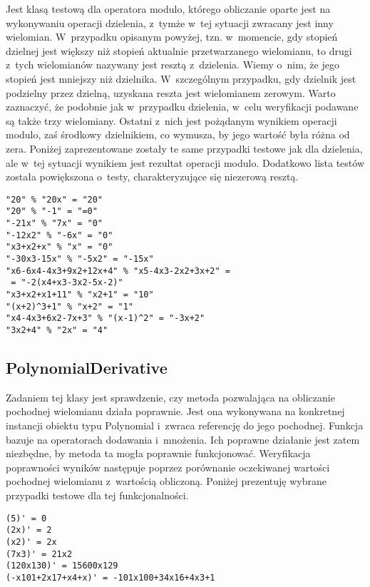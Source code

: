 Jest klasą testową dla operatora modulo, którego obliczanie oparte jest na wykonywaniu operacji dzielenia, z~tymże w~tej sytuacji zwracany jest inny wielomian. W~przypadku opisanym powyżej, tzn. w~momencie, gdy stopień dzielnej jest większy niż stopień aktualnie przetwarzanego wielomianu, to drugi z~tych wielomianów nazywany jest resztą z~dzielenia. Wiemy o~nim, że jego stopień jest mniejszy niż dzielnika. W~szczególnym przypadku, gdy dzielnik jest podzielny przez dzielną, uzyskana reszta jest wielomianem zerowym. Warto zaznaczyć, że podobnie jak w~przypadku dzielenia, w~celu weryfikacji podawane są także trzy wielomiany. Ostatni z~nich jest pożądanym wynikiem operacji modulo, zaś środkowy dzielnikiem, co wymusza, by jego wartość była różna od zera. Poniżej zaprezentowane zostały te same przypadki testowe jak dla dzielenia, ale w~tej sytuacji wynikiem jest rezultat operacji modulo. Dodatkowo lista testów została powiększona o~testy, charakteryzujące się niezerową resztą.

\begin{lstlisting}
"20" % "20x" = "20"
"20" % "-1" = "=0"
"-21x" % "7x" = "0"
"-12x2" % "-6x" = "0"
"x3+x2+x" % "x" = "0"
"-30x3-15x" % "-5x2" = "-15x"
"x6-6x4-4x3+9x2+12x+4" % "x5-4x3-2x2+3x+2" =
 = "-2(x4+x3-3x2-5x-2)"
"x3+x2+x1+11" % "x2+1" = "10"
"(x+2)^3+1" % "x+2" = "1"
"x4-4x3+6x2-7x+3" % "(x-1)^2" = "-3x+2"
"3x2+4" % "2x" = "4"
\end{lstlisting}

\subsection{PolynomialDerivative}

Zadaniem tej klasy jest sprawdzenie, czy metoda pozwalająca na obliczanie pochodnej wielomianu działa poprawnie. Jest ona wykonywana na konkretnej instancji obiektu typu Polynomial i~zwraca referencję do jego pochodnej. Funkcja bazuje na operatorach dodawania i~mnożenia. Ich poprawne działanie jest zatem niezbędne, by metoda ta mogła poprawnie funkcjonować.
Weryfikacja poprawności wyników następuje poprzez porównanie oczekiwanej wartości pochodnej wielomianu z~wartością obliczoną. Poniżej prezentuję wybrane przypadki testowe dla tej funkcjonalności.

\begin{lstlisting}
(5)' = 0
(2x)' = 2
(x2)' = 2x
(7x3)' = 21x2
(120x130)' = 15600x129
(-x101+2x17+x4+x)' = -101x100+34x16+4x3+1
\end{lstlisting}

